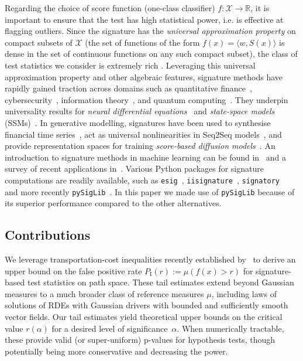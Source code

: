 \documentclass[twoside,11pt]{article}
\numberwithin{equation}{section}
\numberwithin{theorem}{section}
\newcommand{\R}{\mathbb{R}}
\newcommand{\X}{\mathcal{X}}
\begin{document}
Regarding the choice of score function (one-class classifier) $f:\X\to\R$, it is important to ensure that the test has high statistical power, i.e. is effective at flagging outliers. Since the signature has the \emph{universal approximation property} on compact subsets of $\X$ (the set of functions of the form $f(x)=\langle w, S(x)\rangle$ is dense in the set of continuous functions on any such compact subset), the class of test statistics we consider is extremely rich \citep{arribas2018derivatives}. Leveraging this universal approximation property and other algebraic features, signature methods have rapidly gained traction across domains such as quantitative finance~\citep{perez2020signatures, cuchiero2023signature, abi2025signature, cuchiero2023signature, bonesini2024rough}, cybersecurity~\citep{cochrane2021sk}, information theory~\citep{salvi2021rough, salvi2023structure, shmelev2024sparse}, and quantum computing~\citep{crew2025quantum}. They underpin universality results for \emph{neural differential equations}~\citep{morrill2021neural, arribas2020sigsdes} and \emph{state-space models} (SSMs)~\citep{cirone2024theoretical, cirone2025parallelflow, walker2025structured}. In generative modelling, signatures have been used to synthesise financial time series~\citep{buehler2020data}, act as universal nonlinearities in Seq2Seq models~\citep{kidger2019deep}, and provide representation spaces for training \emph{score-based diffusion models}~\citep{barancikovasigdiffusions}. 
An introduction to signature methods in machine learning can be found in~\citep{cass2024lecture} and a survey of recent applications in~\citep{fermanian2023new}.
Various Python packages for signature computations are readily available, such as \texttt{esig}~\citep{esig}, \texttt{iisignature}~\citep{reizenstein2018iisignature}, \texttt{signatory}~\citep{signatory} and more recently \texttt{pySigLib}~\citep{shmelev2025pysiglib}. In this paper we made use of \texttt{pySigLib} because of its superior performance compared to the other alternatives.



\subsection{Contributions}

We leverage transportation-cost inequalities recently established by~\citet{gasteratos2023transportation} to derive an upper bound on the false positive rate $P_{\mathrm{I}}(r):=\mu(f(x)> r)$ for signature-based test statistics on path space. These tail estimates extend beyond Gaussian measures to a much broader class of reference measures $\mu$, including laws of solutions of RDEs with Gaussian drivers with bounded and sufficiently smooth vector fields. Our tail estimates yield theoretical upper bounds on the critical value $r(\alpha)$ for a desired level of significance~$\alpha$. When numerically tractable, these provide valid (or super-uniform) p-values for hypothesis tests, though potentially being more conservative and decreasing the power.
\end{document}
